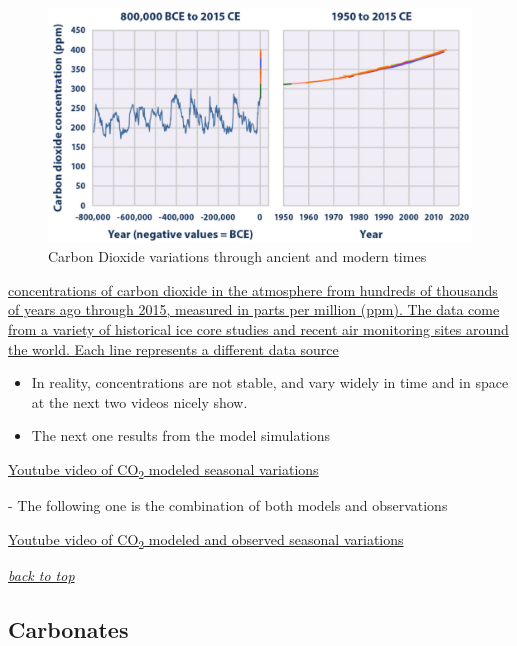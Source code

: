\documentclass[]{book}
\theoremstyle{definition}
\theoremstyle{definition}
\theoremstyle{definition}
\theoremstyle{remark}
\begin{document}
\begin{figure}
\centering
\includegraphics{pictures/CO2_atm_concentrations.png}
\caption{Carbon Dioxide variations through ancient and modern times}
\end{figure}

\href{https://https://www.epa.gov/sites/production/files/2016-08/documents/print_ghg-concentrations-2016.pdf}{concentrations
of carbon dioxide in the atmosphere from hundreds of thousands of years
ago through 2015, measured in parts per million (ppm). The data come
from a variety of historical ice core studies and recent air monitoring
sites around the world. Each line represents a different data source}
\citep{Epa2016-yj}

\begin{itemize}
\item
  In reality, concentrations are not stable, and vary widely in time and
  in space at the next two videos nicely show.
\item
  The next one results from the model simulations
\end{itemize}

\href{https://www.youtube.com/embed/WGHkY0E4FMY}{Youtube video of
CO\textsubscript{2} modeled seasonal variations}

 - The following one is the combination of both models and observations

\href{https://www.youtube.com/embed/2BWWrJr6TJw}{Youtube video of
CO\textsubscript{2} modeled and observed seasonal variations}

\emph{\protect\hyperlink{top}{back to top}}

\hypertarget{carbonates}{\subsection{Carbonates}\label{carbonates}}
\end{document}
